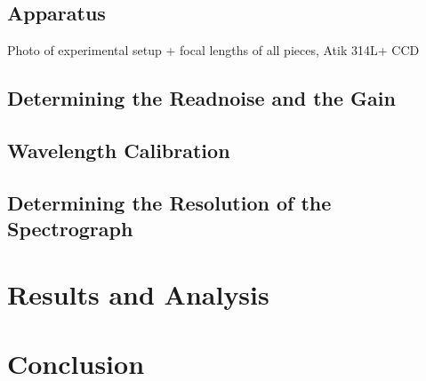 \documentclass[a4paper,12pt,twocolumn]{article}
\begin{document}
		\subsection{Apparatus}
			Photo of experimental setup + focal lengths of all pieces, Atik 314L+ CCD
	
		\subsection{Determining the Readnoise and the Gain}
		
		\subsection{Wavelength Calibration}
	
		\subsection{Determining the Resolution of the Spectrograph}
	
	\section{Results and Analysis}
	
	\section{Conclusion}
	
	\printbibliography
\end{document}
